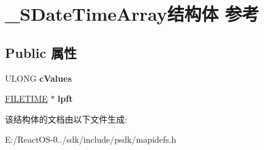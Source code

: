 \hypertarget{struct___s_date_time_array}{}\section{\+\_\+\+S\+Date\+Time\+Array结构体 参考}
\label{struct___s_date_time_array}
\subsection*{Public 属性}
\begin{DoxyCompactItemize}
\item 
\mbox{\label{struct___s_date_time_array_a32b2d589e244b47403bca397c2a339c9}} 
U\+L\+O\+NG {\bfseries c\+Values}
\item 
\mbox{\label{struct___s_date_time_array_a05b75842d611b91116b5abc38b429ca5}} 
\hyperlink{struct___f_i_l_e_t_i_m_e}{F\+I\+L\+E\+T\+I\+ME} $\ast$ {\bfseries lpft}
\end{DoxyCompactItemize}


该结构体的文档由以下文件生成\+:\begin{DoxyCompactItemize}
\item 
E\+:/\+React\+O\+S-\/0../sdk/include/psdk/mapidefs.\+h\end{DoxyCompactItemize}
